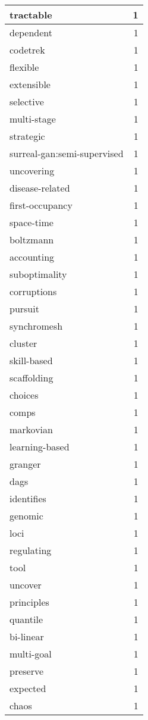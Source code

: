 \begin{table}[h]
\begin{tabular}{|l|r|}
\hline
tractable & 1 \\
\hline
dependent & 1 \\
\hline
codetrek & 1 \\
\hline
flexible & 1 \\
\hline
extensible & 1 \\
\hline
selective & 1 \\
\hline
multi-stage & 1 \\
\hline
strategic & 1 \\
\hline
surreal-gan:semi-supervised & 1 \\
\hline
uncovering & 1 \\
\hline
disease-related & 1 \\
\hline
first-occupancy & 1 \\
\hline
space-time & 1 \\
\hline
boltzmann & 1 \\
\hline
accounting & 1 \\
\hline
suboptimality & 1 \\
\hline
corruptions & 1 \\
\hline
pursuit & 1 \\
\hline
synchromesh & 1 \\
\hline
cluster & 1 \\
\hline
skill-based & 1 \\
\hline
scaffolding & 1 \\
\hline
choices & 1 \\
\hline
comps & 1 \\
\hline
markovian & 1 \\
\hline
learning-based & 1 \\
\hline
granger & 1 \\
\hline
dags & 1 \\
\hline
identifies & 1 \\
\hline
genomic & 1 \\
\hline
loci & 1 \\
\hline
regulating & 1 \\
\hline
tool & 1 \\
\hline
uncover & 1 \\
\hline
principles & 1 \\
\hline
quantile & 1 \\
\hline
bi-linear & 1 \\
\hline
multi-goal & 1 \\
\hline
preserve & 1 \\
\hline
expected & 1 \\
\hline
chaos & 1 \\

\end{tabular}
\end{table}

